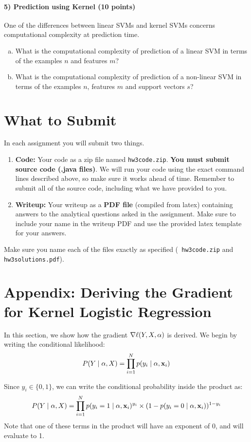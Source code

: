 \documentclass[11pt]{article}
\newcommand{\va}{{\bf \alpha}}
\newcommand{\vxi}{{\bf x}_i}
\newcommand{\yi}{y_i}
\begin{document}
\paragraph{5) Prediction using Kernel (10 points)} 
One of the differences between linear SVMs and kernel SVMs concerns computational complexity at prediction time.
\begin{enumerate}[(a)]
\item What is the computational complexity of prediction of a linear SVM in terms of the examples $n$ and features $m$?
\item What is the computational complexity of prediction of a non-linear SVM in terms of the examples $n$, features $m$ and support vectors $s$?
\end{enumerate}


\section{What to Submit}
In each assignment you will submit two things.
\begin{enumerate}
\item {\bf Code:} Your code as a zip file named {\tt hw3code.zip}. {\bf You must submit source code (.java files)}. We will run your code using the exact command lines described above, so make sure it works ahead of time. Remember to submit all of the source code, including what we have provided to you.
\item {\bf Writeup:} Your writeup as a {\bf PDF file} (compiled from latex) containing answers to the analytical questions asked in the assignment. Make sure to include your name in the writeup PDF and use the provided latex template for your answers.
\end{enumerate}
Make sure you name each of the files exactly as specified ({\tt
  hw3code.zip} and {\tt hw3solutions.pdf}).


\section{Appendix: Deriving the Gradient for Kernel Logistic Regression}

In this section, we show how the gradient $\nabla \ell(Y,X,\va)$ is derived.
We begin by writing the conditional likelihood:
\begin{equation}
P(Y \mid \va, X) = \prod_{i=1}^N{p(\yi \mid \va, \vxi)}
\end{equation}

Since $\yi \in \{ 0,1 \}$, we can write the conditional probability inside the product as:
\begin{equation}
P(Y \mid \va, X) = \prod_{i=1}^N{ p(\yi=1 \mid \va, \vxi)^{\yi} \times (1-p(\yi=0 \mid \va, \vxi))^{1-\yi}}
\end{equation}
Note that one of these terms in the product will have an exponent of 0, and will evaluate to 1.\\
\end{document}
